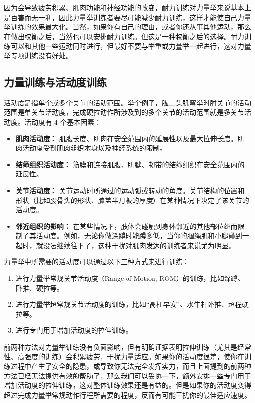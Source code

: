 \documentclass[fontset=fandol, a4paper, 12pt, openright]{ctexbook}
\begin{document}
因为会导致疲劳积累、肌肉功能和神经功能的改变，耐力训练对力量举来说基本上是百害而无一利，因此力量举训练者要尽可能减少耐力训练，这样才能使自己力量举训练的效果最大化。当然，如果你有自己的理由，或者你还从事其他运动，那么在做出权衡之后，当然也可以安排耐力训练。但这是一种权衡之后的选择。耐力训练可以和其他一些运动同时进行，但最好不要与举重或力量举一起进行，这对力量举专项训练没有好处。

\subsection{力量训练与活动度训练}

活动度是指单个或多个关节的活动范围。举个例子，肱二头肌弯举时肘关节的活动范围是单关节活动度，完成硬拉动作所涉及到的多个关节的活动范围就是多关节活动度。活动度有 4 个基本因素：

\begin{itemize}
    \item \textbf{肌肉活动度：} 肌腹长度、肌肉在安全范围内的延展性以及最大拉伸长度。肌肉活动度受到肌肉组织本身以及神经系统的限制。
    \item \textbf{结缔组织活动度：} 筋膜和连接肌腹、肌腱、韧带的结缔组织在安全范围内的延展性。
    \item \textbf{关节活动度：} 关节运动时所通过的运动弧或转动的角度。关节结构的位置和形状（比如股骨头的形状、膝盖半月板的厚度）在某种情况下决定了该关节的活动度。
    \item \textbf{邻近组织的影响：} 在某些情况下，肢体会碰触到身体邻近的其他部位继而限制了其活动度。例如，无论你做深蹲时能蹲多低，当你的腘绳肌和小腿碰到一起时，就没法继续往下了，这种干扰对肌肉发达的训练者来说尤为明显。
\end{itemize}

力量举中所需要的活动度可以通过以下三种方式来进行训练：
\begin{enumerate}
    \item 进行力量举常规关节活动度（Range of Motion, ROM）的训练，比如深蹲、卧推、硬拉等。
    \item 进行力量举超常规关节活动度的训练，比如“高杠早安”、水牛杆卧推、超程硬拉等。
    \item 进行专门用于增加活动度的拉伸训练。
\end{enumerate}

前两种方法对力量举训练没有负面影响，但有明确证据表明拉伸训练（尤其是经常性、高强度的训练）会积累疲劳，干扰力量适应。如果你的活动度很差，使你在训练过程中产生了安全的隐患，或导致你无法完全发挥实力，而且上面提到的前两种方法已经无法提供有效的帮助了，那么我们可以妥协一下，额外安排一些专门用于增加活动度的拉伸训练，这对整体训练效果还是有益的。但是如果你的活动度变得超过完成力量举常规动作行程所需要的程度，反而有可能干扰你的最佳适应速度。
\end{document}
